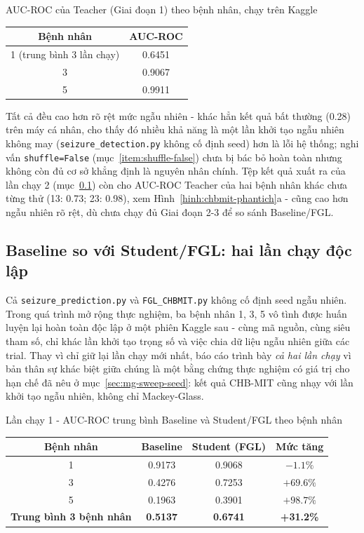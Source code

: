 \begin{table}[H]{AUC-ROC của Teacher (Giai đoạn 1) theo bệnh nhân, chạy trên Kaggle}
	\label{bang:chbmit-detection}
	\centering
	\begin{tabular}{cc}
		\toprule
		\textbf{Bệnh nhân} & \textbf{AUC-ROC} \\
		\midrule
		1 (trung bình 3 lần chạy) & 0.6451 \\
		3 & 0.9067 \\
		5 & 0.9911 \\
		\bottomrule
	\end{tabular}
\end{table}

Tất cả đều cao hơn rõ rệt mức ngẫu nhiên - khác hẳn kết quả bất thường (0.28) trên máy cá
nhân, cho thấy đó nhiều khả năng là một lần khởi tạo ngẫu nhiên không may
(\texttt{seizure\_detection.py} không cố định seed) hơn là lỗi hệ thống; nghi vấn \texttt{shuffle=False}
(mục~\ref{item:shuffle-false}) chưa bị bác bỏ hoàn toàn nhưng không còn đủ cơ sở khẳng định là
nguyên nhân chính. Tệp kết quả xuất ra của lần chạy 2 (mục~\ref{sec:chbmit-hailanchay}) còn cho
AUC-ROC Teacher của hai bệnh nhân khác chưa từng thử (13: 0.73; 23: 0.98), xem Hình~\ref{hinh:chbmit-phantich}a
- cũng cao hơn ngẫu nhiên rõ rệt, dù chưa chạy đủ Giai đoạn 2-3 để so sánh Baseline/FGL.

\subsection{Baseline so với Student/FGL: hai lần chạy độc lập}
\label{sec:chbmit-hailanchay}

Cả \texttt{seizure\_prediction.py} và \texttt{FGL\_CHBMIT.py} không cố định seed ngẫu nhiên.
Trong quá trình mở rộng thực nghiệm, ba bệnh nhân 1, 3, 5 vô tình được huấn luyện lại hoàn toàn
độc lập ở một phiên Kaggle sau - cùng mã nguồn, cùng siêu tham số, chỉ khác lần khởi tạo
trọng số và việc chia dữ liệu ngẫu nhiên giữa các trial. Thay vì chỉ giữ lại lần chạy mới nhất,
báo cáo trình bày \textit{cả hai lần chạy} vì bản thân sự khác biệt giữa chúng là một bằng
chứng thực nghiệm có giá trị cho hạn chế đã nêu ở mục~\ref{sec:mg-sweep-seed}: kết quả CHB-MIT
cũng nhạy với lần khởi tạo ngẫu nhiên, không chỉ Mackey-Glass.

\begin{table}[H]{Lần chạy 1 - AUC-ROC trung bình Baseline và Student/FGL theo bệnh nhân}
	\label{bang:chbmit-sosanh-benhnhan}
	\centering
	\begin{tabular}{cccc}
		\toprule
		\textbf{Bệnh nhân} & \textbf{Baseline} & \textbf{Student (FGL)} & \textbf{Mức tăng} \\
		\midrule
		1 & 0.9173 & 0.9068 & $-1.1\%$ \\
		3 & 0.4276 & 0.7253 & $+69.6\%$ \\
		5 & 0.1963 & 0.3901 & $+98.7\%$ \\
		\midrule
		\textbf{Trung bình 3 bệnh nhân} & \textbf{0.5137} & \textbf{0.6741} & \textbf{+31.2\%} \\
		\bottomrule
	\end{tabular}
\end{table}

